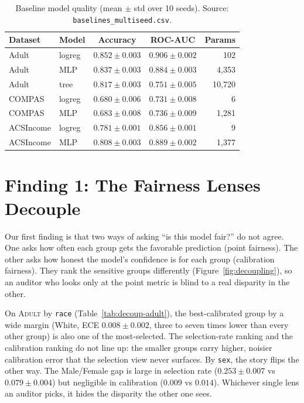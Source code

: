 \documentclass[11pt]{article}
\newcommand{\dataset}[1]{\textsc{#1}}
\begin{document}
\begin{table}[t]
\centering
\caption{Baseline model quality (mean $\pm$ std over 10 seeds).
Source: \texttt{baselines\_multiseed.csv}.}
\label{tab:baselines}
\begin{tabular}{llccr}
\toprule
Dataset & Model & Accuracy & ROC-AUC & Params \\
\midrule
Adult      & logreg & $0.852 \pm 0.003$ & $0.906 \pm 0.002$ & 102 \\
Adult      & MLP    & $0.837 \pm 0.003$ & $0.884 \pm 0.003$ & 4{,}353 \\
Adult      & tree   & $0.817 \pm 0.003$ & $0.751 \pm 0.005$ & 10{,}720 \\
COMPAS     & logreg & $0.680 \pm 0.006$ & $0.731 \pm 0.008$ & 6 \\
COMPAS     & MLP    & $0.683 \pm 0.008$ & $0.736 \pm 0.009$ & 1{,}281 \\
ACSIncome  & logreg & $0.781 \pm 0.001$ & $0.856 \pm 0.001$ & 9 \\
ACSIncome  & MLP    & $0.808 \pm 0.003$ & $0.889 \pm 0.002$ & 1{,}377 \\
\bottomrule
\end{tabular}
\end{table}

\section{Finding 1: The Fairness Lenses Decouple}
\label{sec:decoupling}

Our first finding is that two ways of asking ``is this model fair?'' do not
agree. One asks how often each group gets the favorable prediction (point
fairness). The other asks how honest the model's confidence is for each group
(calibration fairness). They rank the sensitive groups differently
(Figure~\ref{fig:decoupling}), so an auditor who looks only at the point metric
is blind to a real disparity in the other.

On \dataset{Adult} by \texttt{race} (Table~\ref{tab:decoup-adult}), the
best-calibrated group by a wide margin (White, ECE $0.008 \pm 0.002$, three to
seven times lower than every other group) is also one of the most-selected. The
selection-rate ranking and the calibration ranking do not line up: the smaller
groups carry higher, noisier calibration error that the selection view never
surfaces. By \texttt{sex}, the story flips the other way. The Male/Female
gap is large in selection rate ($0.253 \pm 0.007$ vs $0.079 \pm 0.004$) but
negligible in calibration ($0.009$ vs $0.014$). Whichever single lens an auditor
picks, it hides the disparity the other one sees.
\end{document}
